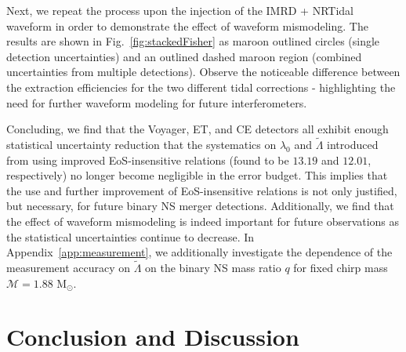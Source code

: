 \documentclass[prd,twocolumn,nofootinbib,superscriptaddress,amsmath,amssymb]{revtex4-1}
\begin{document}
Next, we repeat the process upon the injection of the IMRD + NRTidal waveform in order to demonstrate the effect of waveform mismodeling.
The results are shown in Fig.~\ref{fig:stackedFisher} as maroon outlined circles (single detection uncertainties) and an outlined dashed maroon region (combined uncertainties from multiple detections).
Observe the noticeable difference between the extraction efficiencies for the two different tidal corrections - highlighting the need for further waveform modeling for future interferometers.

Concluding, we find that the Voyager, ET, and CE detectors all exhibit enough statistical uncertainty reduction that the systematics on $\lambda_0$ and $\tilde\Lambda$ introduced from using improved EoS-insensitive relations (found to be $13.19$ and $12.01$, respectively) no longer become negligible in the error budget.
This implies that the use and further improvement of EoS-insensitive relations is not only justified, but necessary, for future binary NS merger detections.
Additionally, we find that the effect of waveform mismodeling is indeed important for future observations as the statistical uncertainties continue to decrease.
In Appendix~\ref{app:measurement}, we additionally investigate the dependence of the measurement accuracy on $\tilde\Lambda$ on the binary NS mass ratio $q$ for fixed chirp mass $\mathcal{M}=1.88\text{ M}_{\odot}$.


\section{Conclusion and Discussion}
\label{sec:conclusion}
\end{document}
